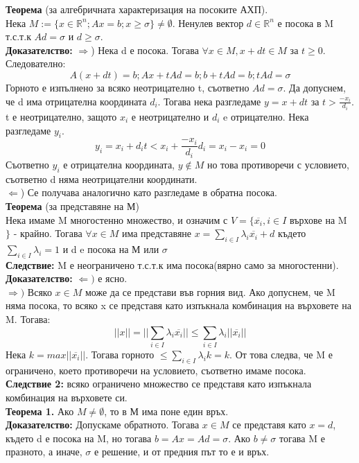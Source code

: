 \documentclass[12pt, a4paper]{article}
\def\D{\mathbb}
\begin{document}
\textbf{Теорема} (за алгебричната характеризация на посоките АХП).\\
Нека $M:=\{x\in\D{R}^n; Ax=b;x\geq\sigma\}\ne\emptyset$. Ненулев вектор $d\in\D{R}^n$ е посока в M т.с.т.к $Ad=\sigma$ и $d\geq\sigma$.\\
\textbf{Доказателство:} $\Rightarrow$) Нека d е посока. Тогава $\forall x \in M, x + dt\in M$ за $t\geq0$. Следователно:
\[A(x+dt)=b; Ax+tAd=b; b+tAd=b; tAd=\sigma\]
Горното е изпълнено за всяко неотрицателно t, съответно $Ad=\sigma$.
Да допуснем, че d има отрицателна координата $d_i$. Тогава нека разгледаме $y=x+dt$ за $t>\frac{-x_i}{d_i}$. t е неотрицателно, защото $x_i$ е неотрицателно и $d_i$ e отрицателно. Нека разгледаме $y_i$.
\[y_i = x_i + d_i t < x_i + \frac{-x_i}{d_i}d_i = x_i-x_i=0\]
Съответно $y_i$ е отрицателна координата, $y \notin M$ но това противоречи с условието, съответно d няма неотрицателни координати.\\
$\Leftarrow$) Се получава аналогично като разгледаме в обратна посока.\\

\textbf{Теорема} (за представяне на М)\\
Нека имаме M многостенно множество, и означим с $V=\{\overline{x_i}, i\in I$ върхове на M $\}$ - крайно. Тогава $\forall x \in M$ има представяне $x = \sum_{i\in I}\lambda_i \overline{x_i} + d$ където $\sum_{i\in I} \lambda_i = 1$ и d e посока на М или $\sigma$\\

\textbf{Следствие:} M е неограничено т.с.т.к има посока(вярно само за многостенни).\\
\textbf{Доказателство:} $\Leftarrow)$ е ясно.\\
$\Rightarrow)$ Всяко $x\in M$ може да се представи във горния вид. Ако допуснем, че M няма посока, то всяко x се представя като изпъкнала комбинация на върховете на M. Тогава:
\[||x||=||\sum_{i\in I}\lambda_i \overline{x_i}||\leq\sum_{i\in I}\lambda_i||\overline{x_i}||\]
Нека $k=max||\overline{x_i}||$. Тогава горното $\leq \sum_{i\in I}\lambda_i k=k$. От това следва, че M е ограничено, което противоречи на условието, съответно имаме посока.\\

\textbf{Следствие 2:} всяко ограничено множество се представя като изпъкнала комбинация на върховете си.\\

\textbf{Теорема 1.} Ако $M\ne\emptyset$, то в М има поне един връх.\\
\textbf{Доказателство:} Допускаме обратното. Тогава $x\in M$ се представя като $x=d$, където d е посока на M, но тогава $b=Ax=Ad=\sigma$. Ако $b\ne\sigma$ тогава M е празното, а иначе, $\sigma$ е решение, и от предния път то е и връх.\\
\end{document}
